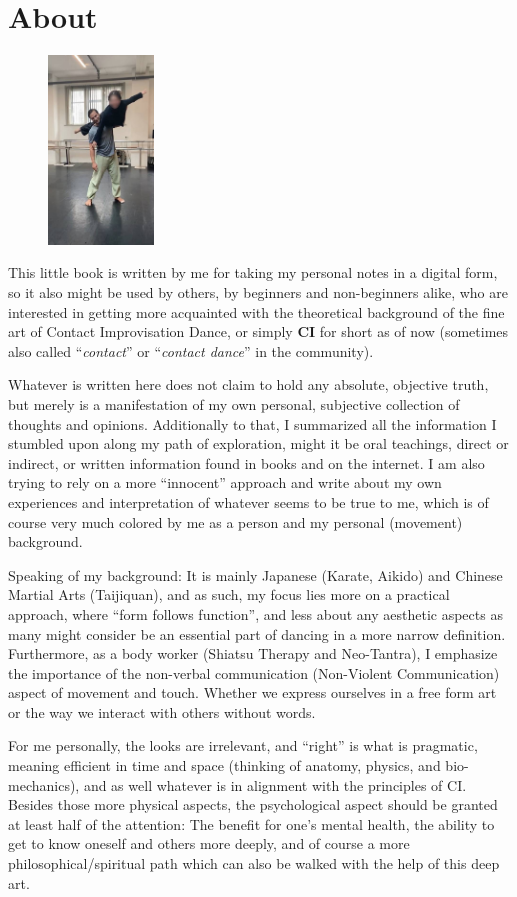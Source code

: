 \section{About}\label{sec:about}

\begin{figure}
\centering
\includegraphics[width=0.25\textwidth]{images/about}
\end{figure}

This little book is written by me for taking my personal notes in a digital form, so it also might be used by others, by beginners and non-beginners alike, who are interested in getting more acquainted with the theoretical background of the fine art of Contact Improvisation Dance, or simply \textbf{CI} for short as of now (sometimes also called ``\textit{contact}'' or ``\textit{contact dance}'' in the community).

Whatever is written here does not claim to hold any absolute, objective truth, but merely is a manifestation of my own personal, subjective collection of thoughts and opinions.
Additionally to that, I summarized all the information I stumbled upon along my path of exploration, might it be oral teachings, direct or indirect, or written information found in books and on the internet.
I am also trying to rely on a more ``innocent'' approach and write about my own experiences and interpretation of whatever seems to be true to me, which is of course very much colored by me as a person and my personal (movement) background.

Speaking of my background: It is mainly Japanese (Karate, Aikido) and Chinese Martial Arts (Taijiquan), and as such, my focus lies more on a practical approach, where ``form follows function'', and less about any aesthetic aspects as many might consider be an essential part of dancing in a more narrow definition.
Furthermore, as a body worker (Shiatsu Therapy and Neo-Tantra), I emphasize the importance of the non-verbal communication (Non-Violent Communication) aspect of movement and touch.
Whether we express ourselves in a free form art or the way we interact with others without words.

For me personally, the looks are irrelevant, and ``right'' is what is pragmatic, meaning efficient in time and space (thinking of anatomy, physics, and bio-mechanics), and as well whatever is in alignment with the principles of CI. Besides those more physical aspects, the psychological aspect should be granted at least half of the attention: The benefit for one's mental health, the ability to get to know oneself and others more deeply, and of course a more philosophical/spiritual path which can also be walked with the help of this deep art.
